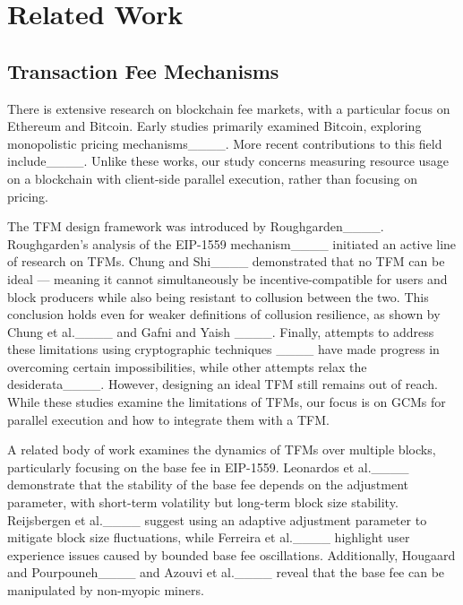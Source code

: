 \section{Related Work}
\subsection{Transaction Fee Mechanisms}

There is extensive research on blockchain fee markets, with a particular focus on Ethereum and Bitcoin. Early studies primarily examined Bitcoin, exploring monopolistic pricing mechanisms____. More recent contributions to this field include____. Unlike these works, our study concerns measuring resource usage on a blockchain with client-side parallel execution, rather than focusing on pricing.



The TFM design framework was introduced by Roughgarden____. Roughgarden's analysis of the EIP-1559 mechanism____ initiated an active line of research on TFMs. Chung and Shi____ demonstrated that no TFM can be ideal --- meaning it cannot simultaneously be incentive-compatible for users and block producers while also being resistant to collusion between the two. This conclusion holds even for weaker definitions of collusion resilience, as shown by Chung et al.____ and Gafni and Yaish ____. Finally, attempts to address these limitations using cryptographic techniques ____ have made progress in overcoming certain impossibilities, while other attempts relax the desiderata____. However, designing an ideal TFM still remains out of reach. While these studies examine the limitations of TFMs, our focus is on GCMs for parallel execution and how to integrate them with a TFM.

A related body of work examines the dynamics of TFMs over multiple blocks, particularly focusing on the base fee in EIP-1559. Leonardos et al.____ demonstrate that the stability of the base fee depends on the adjustment parameter, with short-term volatility but long-term block size stability. Reijsbergen et al.____ suggest using an adaptive adjustment parameter to mitigate block size fluctuations, while Ferreira et al.____ highlight user experience issues caused by bounded base fee oscillations. Additionally, Hougaard and Pourpouneh____ and Azouvi et al.____ reveal that the base fee can be manipulated by non-myopic miners.


